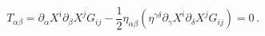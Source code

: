 \begin{equation}
\label{conss} T_{\alpha\beta} = \partial_\alpha X^i
\partial_\beta X^j G_{ij} - \frac{1}{2} \eta_{\alpha\beta}
(\eta^{\gamma\delta}\partial_\gamma X^i
\partial_\delta X^j G_{ij})=0\,.
\end{equation}

